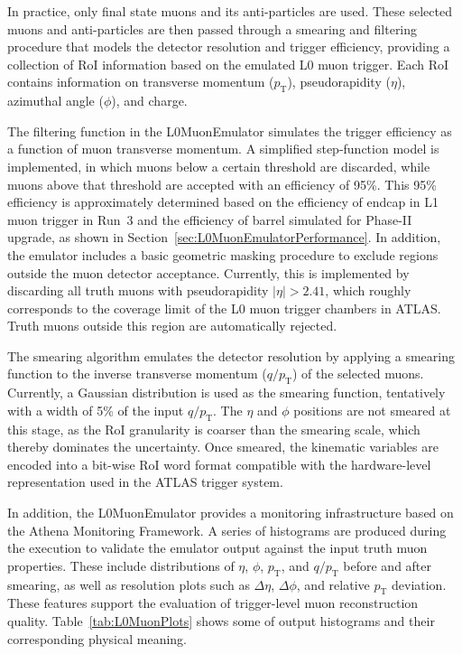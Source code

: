 In practice, only final state muons and its anti-particles are used. These selected muons and anti-particles are then passed through a smearing and filtering procedure that models the detector resolution and trigger efficiency, providing a collection of RoI information based on the emulated L0 muon trigger. Each RoI contains information on transverse momentum ($p_\mathrm{T}$), pseudorapidity ($\eta$), azimuthal angle ($\phi$), and charge.

The filtering function in the L0MuonEmulator simulates the trigger efficiency as a function of muon transverse momentum. A simplified step-function model is implemented, in which muons below a certain threshold are discarded, while muons above that threshold are accepted with an efficiency of 95\%. This 95\% efficiency is approximately determined based on the efficiency of endcap in L1 muon trigger in Run~3 and the efficiency of barrel simulated for Phase-II upgrade, as shown in Section~\ref{sec:L0MuonEmulatorPerformance}. In addition, the emulator includes a basic geometric masking procedure to exclude regions outside the muon detector acceptance. Currently, this is implemented by discarding all truth muons with pseudorapidity $|\eta| > 2.41$, which roughly corresponds to the coverage limit of the L0 muon trigger chambers in ATLAS. Truth muons outside this region are automatically rejected.

The smearing algorithm emulates the detector resolution by applying a smearing function to the inverse transverse momentum ($q/p_\mathrm{T}$) of the selected muons. Currently, a Gaussian distribution is used as the smearing function, tentatively with a width of 5\% of the input $q/p_\mathrm{T}$. The $\eta$ and $\phi$ positions are not smeared at this stage, as the RoI granularity is coarser than the smearing scale, which thereby dominates the uncertainty. Once smeared, the kinematic variables are encoded into a bit-wise RoI word format compatible with the hardware-level representation used in the ATLAS trigger system.

In addition, the L0MuonEmulator provides a monitoring infrastructure based on the Athena Monitoring Framework. A series of histograms are produced during the execution to validate the emulator output against the input truth muon properties. These include distributions of $\eta$, $\phi$, $p_\mathrm{T}$, and $q/p_\mathrm{T}$ before and after smearing, as well as resolution plots such as $\Delta\eta$, $\Delta\phi$, and relative $p_\mathrm{T}$ deviation. These features support the evaluation of trigger-level muon reconstruction quality. Table~\ref{tab:L0MuonPlots} shows some of output histograms and their corresponding physical meaning.


